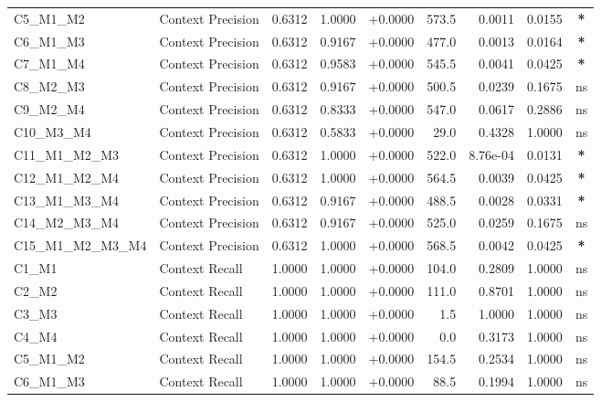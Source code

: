 \begin{table}[p]
\begin{tabular*}{\textwidth}{@{\extracolsep{\fill}} l l r r r r r r c @{}}
\addlinespace
C5\_M1\_M2      & Context Precision    & 0.6312 & 1.0000 & +0.0000 & 573.5 & 0.0011 & 0.0155 & \textbf{*} \\
\addlinespace
C6\_M1\_M3      & Context Precision    & 0.6312 & 0.9167 & +0.0000 & 477.0 & 0.0013 & 0.0164 & \textbf{*} \\
\addlinespace
C7\_M1\_M4      & Context Precision    & 0.6312 & 0.9583 & +0.0000 & 545.5 & 0.0041 & 0.0425 & \textbf{*} \\
\addlinespace
C8\_M2\_M3      & Context Precision    & 0.6312 & 0.9167 & +0.0000 & 500.5 & 0.0239 & 0.1675 & ns \\
\addlinespace
C9\_M2\_M4      & Context Precision    & 0.6312 & 0.8333 & +0.0000 & 547.0 & 0.0617 & 0.2886 & ns \\
\addlinespace
C10\_M3\_M4     & Context Precision    & 0.6312 & 0.5833 & +0.0000 & 29.0 & 0.4328 & 1.0000 & ns \\
\addlinespace
C11\_M1\_M2\_M3 & Context Precision    & 0.6312 & 1.0000 & +0.0000 & 522.0 & 8.76e-04 & 0.0131 & \textbf{*} \\
\addlinespace
C12\_M1\_M2\_M4 & Context Precision    & 0.6312 & 1.0000 & +0.0000 & 564.5 & 0.0039 & 0.0425 & \textbf{*} \\
\addlinespace
C13\_M1\_M3\_M4 & Context Precision    & 0.6312 & 0.9167 & +0.0000 & 488.5 & 0.0028 & 0.0331 & \textbf{*} \\
\addlinespace
C14\_M2\_M3\_M4 & Context Precision    & 0.6312 & 0.9167 & +0.0000 & 525.0 & 0.0259 & 0.1675 & ns \\
\addlinespace
C15\_M1\_M2\_M3\_M4 & Context Precision    & 0.6312 & 1.0000 & +0.0000 & 568.5 & 0.0042 & 0.0425 & \textbf{*} \\
\addlinespace
C1\_M1          & Context Recall       & 1.0000 & 1.0000 & +0.0000 & 104.0 & 0.2809 & 1.0000 & ns \\
\addlinespace
C2\_M2          & Context Recall       & 1.0000 & 1.0000 & +0.0000 & 111.0 & 0.8701 & 1.0000 & ns \\
\addlinespace
C3\_M3          & Context Recall       & 1.0000 & 1.0000 & +0.0000 & 1.5 & 1.0000 & 1.0000 & ns \\
\addlinespace
C4\_M4          & Context Recall       & 1.0000 & 1.0000 & +0.0000 & 0.0 & 0.3173 & 1.0000 & ns \\
\addlinespace
C5\_M1\_M2      & Context Recall       & 1.0000 & 1.0000 & +0.0000 & 154.5 & 0.2534 & 1.0000 & ns \\
\addlinespace
C6\_M1\_M3      & Context Recall       & 1.0000 & 1.0000 & +0.0000 & 88.5 & 0.1994 & 1.0000 & ns \\

\end{tabular*}
\end{table}
